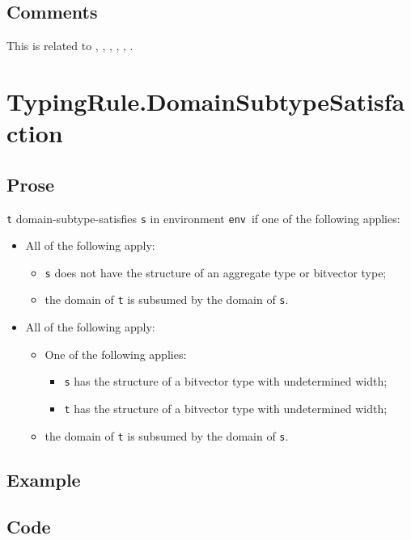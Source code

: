 \documentclass{book}
\newcommand\tenv[0]{\texttt{env}}
\begin{document}
\subsection{Comments}
  This is related to , , , , , .

\section{TypingRule.DomainSubtypeSatisfaction\label{sec:TypingRule.DomainSubtypeSatisfaction}}

\subsection{Prose}
 \texttt{t} domain-subtype-satisfies \texttt{s} in environment \tenv\ if one of the following applies:
 \begin{itemize}
 \item All of the following apply:
    \begin{itemize}
    \item \texttt{s} does not have the structure of an aggregate type or bitvector type;
    \item the domain of \texttt{t} is subsumed by the domain of \texttt{s}.
    \end{itemize}

  \item All of the following apply:
  \begin{itemize}
    \item One of the following applies:
      \begin{itemize}
      \item \texttt{s} has the structure of a bitvector type with undetermined width;
      \item \texttt{t} has the structure of a bitvector type with undetermined width;
      \end{itemize}
   \item the domain of \texttt{t} is subsumed by the domain of \texttt{s}.
   \end{itemize}
  \end{itemize}

  \subsection{Example}

  \subsection{Code}
\end{document}
